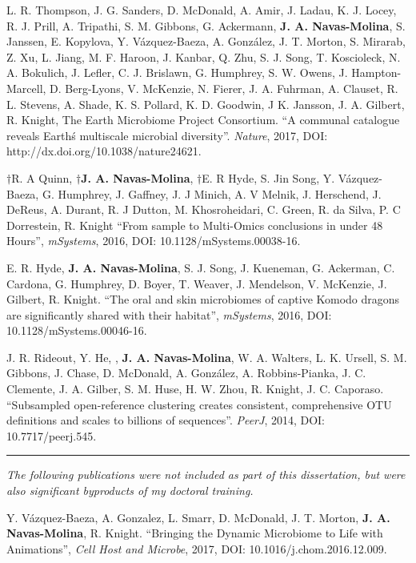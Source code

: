 \begin{frontmatter}
\begin{vitapage}
\begin{publications}
	\item L. R. Thompson, J. G. Sanders, D. McDonald, A. Amir, J. Ladau, K. J. Locey, R. J. Prill, A. Tripathi, S. M. Gibbons, G. Ackermann, \textbf{J. A. Navas-Molina}, S. Janssen, E. Kopylova, Y. V\'azquez-Baeza, A. Gonz\'alez, J. T. Morton, S. Mirarab, Z. Xu, L. Jiang, M. F. Haroon, J. Kanbar, Q. Zhu, S. J. Song, T. Koscioleck, N. A. Bokulich, J. Lefler, C. J. Brislawn, G. Humphrey, S. W. Owens, J. Hampton-Marcell, D. Berg-Lyons, V. McKenzie, N. Fierer, J. A. Fuhrman, A. Clauset, R. L. Stevens, A. Shade, K. S. Pollard, K. D. Goodwin, J K. Jansson, J. A. Gilbert, R. Knight, The Earth Microbiome Project Consortium. ``A communal catalogue reveals Earth\'s multiscale microbial diversity''. \emph{Nature}, 2017, DOI: http://dx.doi.org/10.1038/nature24621.

	\item $\dagger$R. A Quinn, \textbf{$\dagger$J. A. Navas-Molina}, $\dagger$E. R Hyde, S. Jin Song, Y. V\'azquez-Baeza, G. Humphrey, J. Gaffney, J. J Minich, A. V Melnik, J. Herschend, J. DeReus, A. Durant, R. J Dutton, M. Khosroheidari, C. Green, R. da Silva, P. C Dorrestein, R. Knight ``From sample to Multi-Omics conclusions in under 48 Hours'', \emph{mSystems}, 2016, DOI: 10.1128/mSystems.00038-16.

	\item E. R. Hyde, \textbf{J. A. Navas-Molina}, S. J. Song, J. Kueneman, G. Ackerman, C. Cardona, G. Humphrey, D. Boyer, T. Weaver, J. Mendelson, V. McKenzie, J. Gilbert, R. Knight. ``The oral and skin microbiomes of captive Komodo dragons are significantly shared with their habitat'', \emph{mSystems}, 2016, DOI: 10.1128/mSystems.00046-16.

	\item J. R. Rideout, Y. He, , \textbf{J. A. Navas-Molina}, W. A. Walters, L. K. Ursell, S. M. Gibbons, J. Chase, D. McDonald, A. Gonz\'alez, A. Robbins-Pianka, J. C. Clemente, J. A. Gilber, S. M. Huse, H. W. Zhou, R. Knight, J. C. Caporaso. ``Subsampled open-reference clustering creates consistent, comprehensive OTU definitions and scales to billions of sequences''. \emph{PeerJ}, 2014, DOI: 10.7717/peerj.545.

	\item \noindent\rule[0.5ex]{\linewidth}{0.5pt}

    \textsl{The following publications were not included as part of this dissertation, but were also significant byproducts of my doctoral training.}

	\item Y. V\'azquez-Baeza, A. Gonzalez, L. Smarr, D. McDonald, J. T. Morton, \textbf{J. A. Navas-Molina}, R. Knight. ``Bringing the Dynamic Microbiome to Life with Animations'', \emph{Cell Host and Microbe}, 2017, DOI: 10.1016/j.chom.2016.12.009.


\end{publications}
\end{vitapage}
\end{frontmatter}
